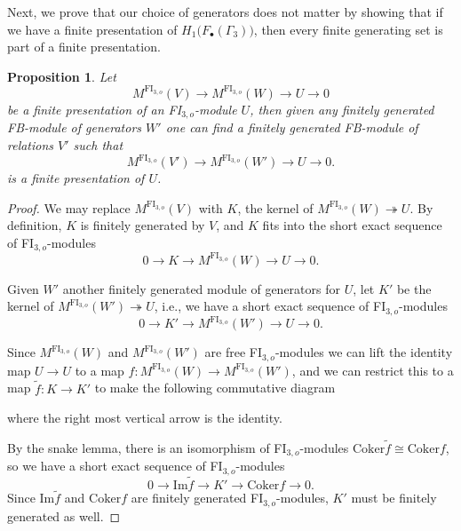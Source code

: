 \documentclass[pagebackref,colorlinks,citecolor=blue,linkcolor=blue,urlcolor=blue,filecolor=blue]{article}
\newtheorem{prop}[thm]{Proposition}
\theoremstyle{definition}\newtheorem{definition}[thm]{Definition}
\theoremstyle{definition}
\begin{document}
Next, we prove that our choice of generators does not matter by showing that if we have a finite presentation of $H_{1}\big(F_{\bullet}(\Gamma_{3})\big)$, then every finite generating set is part of a finite presentation.

\begin{prop}\label{all presentations are the same}
Let 
\[
M^{\text{FI}_{3,o}}(V)\to M^{\text{FI}_{3,o}}(W)\to U\to 0
\]
be a finite presentation of an FI$_{3,o}$-module $U$, then given any finitely generated FB-module of generators $W'$ one can find a finitely generated FB-module of relations $V'$ such that
\[
M^{\text{FI}_{3,o}}(V')\to M^{\text{FI}_{3,o}}(W')\to U\to 0.
\]
is a finite presentation of $U$.
\end{prop}

\begin{proof}
We may replace $M^{\text{FI}_{3,o}}(V)$ with $K$, the kernel of $M^{\text{FI}_{3,o}}(W)\twoheadrightarrow U$.
By definition, $K$ is finitely generated by $V$, and $K$ fits into the short exact sequence of FI$_{3,o}$-modules
\[
0\to K\to M^{\text{FI}_{3,o}}(W)\to U\to 0.
\]

Given $W'$ another finitely generated module of generators for $U$, let $K'$ be the kernel of $M^{\text{FI}_{3,o}}(W')\twoheadrightarrow U$, i.e., we have a short exact sequence of FI$_{3,o}$-modules
\[
0\to K'\to M^{\text{FI}_{3,o}}(W')\to U\to 0.
\]

Since $M^{\text{FI}_{3,o}}(W)$ and $M^{\text{FI}_{3,o}}(W')$ are free FI$_{3,o}$-modules we can lift the identity map $U\to U$ to a map $f:M^{\text{FI}_{3,o}}(W)\to M^{\text{FI}_{3,o}}(W')$, and we can restrict this to a map $\tilde{f}:K\to K'$ to make the following commutative diagram

\begin{center}
\end{center}
where the right most vertical arrow is the identity.

By the snake lemma, there is an isomorphism of FI$_{3,o}$-modules $\text{Coker}\tilde{f}\cong \text{Coker}f$, so we have a short exact sequence of FI$_{3,o}$-modules
\[
0\to \text{Im}\tilde{f}\to K'\to \text{Coker}f\to 0.
\]
Since $\text{Im}\tilde{f}$ and $\text{Coker}f$ are finitely generated FI$_{3,o}$-modules, $K'$ must be finitely generated as well.
\end{proof}
\end{document}
